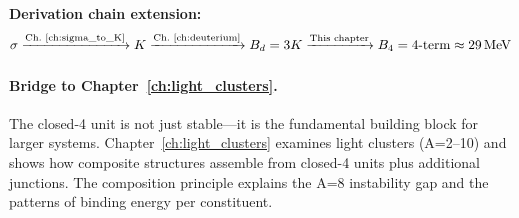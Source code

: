 \bigskip
\noindent
\textbf{Derivation chain extension:}
\begin{equation*}
    \sigma \xrightarrow{\text{Ch.~\ref{ch:sigma_to_K}}} K
    \xrightarrow{\text{Ch.~\ref{ch:deuterium}}} B_d = 3K
    \xrightarrow{\text{This chapter}} B_4 = 4\text{-term} \approx 29\,\mathrm{MeV}
\end{equation*}

\paragraph{Bridge to Chapter~\ref{ch:light_clusters}.}
The closed-4 unit is not just stable---it is the fundamental building block
for larger systems. Chapter~\ref{ch:light_clusters} examines light clusters
(A=2--10) and shows how composite structures assemble from closed-4 units
plus additional junctions. The composition principle explains the A=8
instability gap and the patterns of binding energy per constituent.

